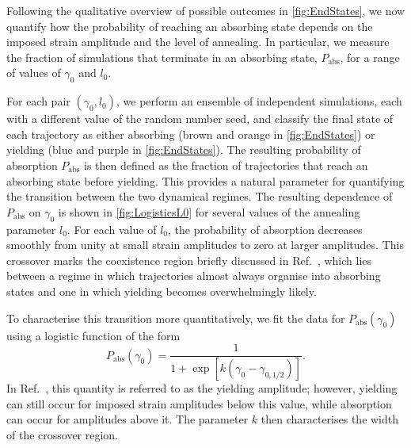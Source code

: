 \documentclass[asymmetricmargins]{library/duthesis}%
\begin{document}
Following the qualitative overview of possible outcomes in \cref{fig:EndStates}, we now quantify how the probability of reaching an absorbing state depends on the imposed strain amplitude and the level of annealing. In particular, we measure the fraction of simulations that terminate in an absorbing state, $P_{\mathrm{abs}}$, for a range of values of $\gamma_0$ and $l_0$. 

For each pair $(\gamma_0,l_0)$, we perform an ensemble of independent simulations, each with a different value of the random number seed, and classify the final state of each trajectory as either absorbing (brown and orange in \cref{fig:EndStates}) or yielding (blue and purple in \cref{fig:EndStates}). The resulting probability of absorption $P_{\mathrm{abs}}$ is then defined as the fraction of trajectories that reach an absorbing state before yielding. This provides a natural parameter for quantifying the transition between the two dynamical regimes. The resulting dependence of $P_{\mathrm{abs}}$ on $\gamma_0$ is shown in \cref{fig:LogisticsL0} for several values of the annealing parameter $l_0$. For each value of $l_0$, the probability of absorption decreases smoothly from unity at small strain amplitudes to zero at larger amplitudes. This crossover marks the coexistence region briefly discussed in Ref.~\cite{khandareElastoplasticModellingCyclic2026}, which lies between a regime in which trajectories almost always organise into absorbing states and one in which yielding becomes overwhelmingly likely. 

To characterise this transition more quantitatively, we fit the data for $P_{\mathrm{abs}}(\gamma_0)$ using a logistic function of the form
\[
    P_{\mathrm{abs}}(\gamma_0)=\frac{1}{1+\exp\!\left[k(\gamma_0-\gamma_{0,1/2})\right]}.
\]
In Ref.~\cite{khandareElastoplasticModellingCyclic2026}, this quantity is referred to as the yielding amplitude; however, yielding can still occur for imposed strain amplitudes below this value, while absorption can occur for amplitudes above it. The parameter $k$ then characterises the width of the crossover region.
\end{document}
